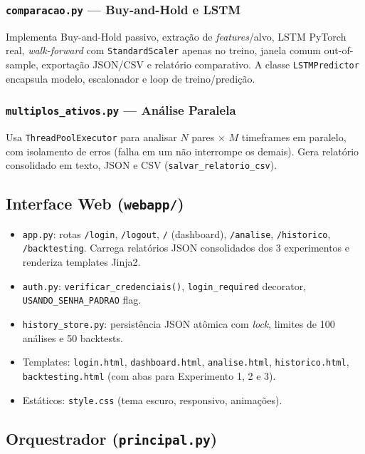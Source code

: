 \documentclass[conference]{IEEEtran}
\begin{document}
\subsubsection{\texttt{comparacao.py} — Buy-and-Hold e LSTM}

Implementa Buy-and-Hold passivo, extração de \textit{features}/alvo, LSTM PyTorch real, \textit{walk-forward} com \texttt{StandardScaler} apenas no treino, janela comum out-of-sample, exportação JSON/CSV e relatório comparativo. A classe \texttt{LSTMPredictor} encapsula modelo, escalonador e loop de treino/predição.

\subsubsection{\texttt{multiplos\_ativos.py} — Análise Paralela}

Usa \texttt{ThreadPoolExecutor} para analisar $N$ pares × $M$ timeframes em paralelo, com isolamento de erros (falha em um não interrompe os demais). Gera relatório consolidado em texto, JSON e CSV (\texttt{salvar\_relatorio\_csv}).

\subsection{Interface Web (\texttt{webapp/})}

\begin{itemize}
  \item \texttt{app.py}: rotas \texttt{/login}, \texttt{/logout}, \texttt{/} (dashboard), \texttt{/analise}, \texttt{/historico}, \texttt{/backtesting}. Carrega relatórios JSON consolidados dos 3 experimentos e renderiza templates Jinja2.
  \item \texttt{auth.py}: \texttt{verificar\_credenciais()}, \texttt{login\_required} decorator, \texttt{USANDO\_SENHA\_PADRAO} flag.
  \item \texttt{history\_store.py}: persistência JSON atômica com \textit{lock}, limites de 100 análises e 50 backtests.
  \item Templates: \texttt{login.html}, \texttt{dashboard.html}, \texttt{analise.html}, \texttt{historico.html}, \texttt{backtesting.html} (com abas para Experimento 1, 2 e 3).
  \item Estáticos: \texttt{style.css} (tema escuro, responsivo, animações).
\end{itemize}

\subsection{Orquestrador (\texttt{principal.py})}
\end{document}
